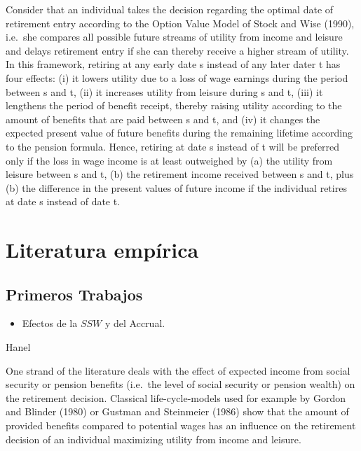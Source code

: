 \documentclass[]{article}
\providecommand{\tightlist}{%
  \setlength{\itemsep}{0pt}\setlength{\parskip}{0pt}}
\begin{document}
Consider that an individual takes the decision regarding the optimal
date of retirement entry according to the Option Value Model of Stock
and Wise (1990), i.e.~she compares all possible future streams of
utility from income and leisure and delays retirement entry if she can
thereby receive a higher stream of utility. In this framework, retiring
at any early date s instead of any later dater t has four effects: (i)
it lowers utility due to a loss of wage earnings during the period
between s and t, (ii) it increases utility from leisure during s and t,
(iii) it lengthens the period of benefit receipt, thereby raising
utility according to the amount of benefits that are paid between s and
t, and (iv) it changes the expected present value of future benefits
during the remaining lifetime according to the pension formula. Hence,
retiring at date s instead of t will be preferred only if the loss in
wage income is at least outweighed by (a) the utility from leisure
between s and t, (b) the retirement income received between s and t,
plus (b) the difference in the present values of future income if the
individual retires at date s instead of date t.

\hypertarget{literatura-empuxedrica}{%
\section{Literatura empírica}\label{literatura-empuxedrica}}

\hypertarget{primeros-trabajos}{%
\subsection{Primeros Trabajos}\label{primeros-trabajos}}

\begin{itemize}
\tightlist
\item
  Efectos de la \(SSW\) y del Accrual.
\end{itemize}

Hanel

One strand of the literature deals with the effect of expected income
from social security or pension benefits (i.e.~the level of social
security or pension wealth) on the retirement decision. Classical
life-cycle-models used for example by Gordon and Blinder (1980) or
Gustman and Steinmeier (1986) show that the amount of provided benefits
compared to potential wages has an influence on the retirement decision
of an individual maximizing utility from income and leisure.
\end{document}
